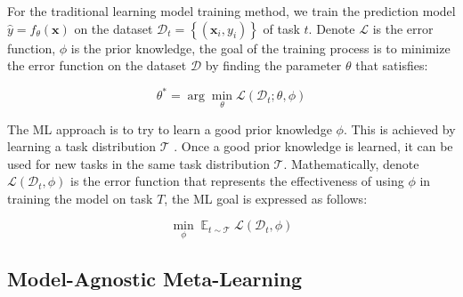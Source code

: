 For the traditional learning model training method, we train the prediction model $\hat{y} = f_\theta(\mathbf{x})$ on the dataset $\mathcal{D}_t = \left\{ \left(\mathbf{x}_i, y_i \right) \right\}$ of task $t$. Denote $\mathcal{L}$ is the error function, $\phi$ is the prior knowledge, the goal of the training process is to minimize the error function on the dataset $\mathcal{D}$ by finding the parameter $\theta$ that satisfies:

\begin{equation}
    \theta^* = \arg\min_{\theta}{\mathcal{L}(\mathcal{D}_t; \theta, \phi)}
\end{equation}


The ML approach is to try to learn a good prior knowledge $\phi$. This is achieved by learning a task distribution $\mathcal{T}$ \cite{hospedales2021meta}. Once a good prior knowledge is learned, it can be used for new tasks in the same task distribution $\mathcal{T}$. Mathematically, denote $\mathcal{L}(\mathcal{D}_t, \phi)$ is the error function that represents the effectiveness of using $\phi$ in training the model on task $T$, the ML goal is expressed as follows:

\begin{equation}
    \min_{\phi} \mathop{\mathbb{E}}_{t\sim \mathcal{T}} \mathcal{L}(\mathcal{D}_t, \phi)
\end{equation}

\subsection{Model-Agnostic Meta-Learning}


